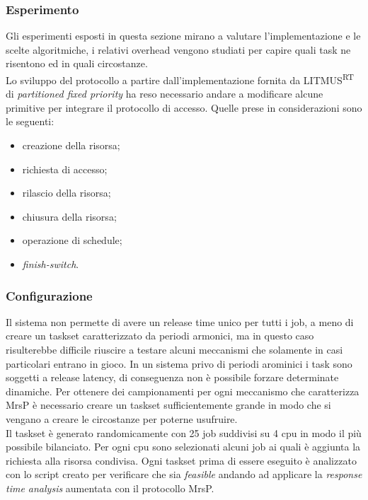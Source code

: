 \subsubsection{Esperimento}
\label{sec:overhead_exp}

\noindent Gli esperimenti esposti in questa sezione mirano a valutare l'implementazione e le scelte algoritmiche, i relativi overhead vengono studiati per capire quali task ne risentono ed in quali circostanze.\\

\noindent Lo sviluppo del protocollo a partire dall'implementazione fornita da LITMUS\textsuperscript{RT} di \textit{partitioned fixed priority} ha reso necessario andare a modificare alcune primitive per integrare il protocollo di accesso. Quelle prese in considerazioni sono le seguenti:

\begin{itemize}
	\item creazione della risorsa;
	\item richiesta di accesso;
	\item rilascio della risorsa;
	\item chiusura della risorsa;
	\item operazione di schedule;
	\item \textit{finish-switch}.
\end{itemize}

\subsubsection{Configurazione}
\label{sec:overhead_conf}

\noindent Il sistema non permette di avere un release time unico per tutti i job, a meno di creare un taskset caratterizzato da periodi armonici, ma in questo caso risulterebbe difficile riuscire a testare alcuni meccanismi che solamente in casi particolari entrano in gioco. In un sistema privo di periodi arominici i task sono soggetti a release latency, di conseguenza non è possibile forzare determinate dinamiche. Per ottenere dei campionamenti per ogni meccanismo che caratterizza MrsP è necessario creare un taskset sufficientemente grande in modo che si vengano a creare le circostanze per poterne usufruire.\\
\noindent Il taskset è generato randomicamente con 25 job suddivisi su 4 cpu in modo il più possibile bilanciato. Per ogni cpu sono selezionati alcuni job ai quali è aggiunta la richiesta alla risorsa condivisa. Ogni taskset prima di essere eseguito è analizzato con lo script creato per verificare che sia \textit{feasible} andando ad applicare la \textit{response time analysis} aumentata con il protocollo MrsP.\\

